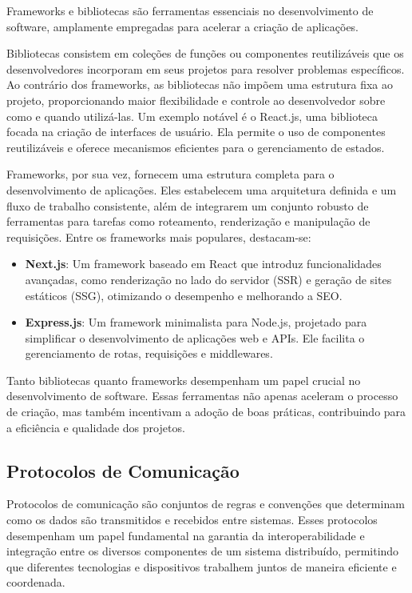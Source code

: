 
Frameworks e bibliotecas são ferramentas essenciais no desenvolvimento de software, amplamente empregadas para acelerar a criação de aplicações.

Bibliotecas consistem em coleções de funções ou componentes reutilizáveis que os desenvolvedores incorporam em seus projetos para resolver problemas específicos. Ao contrário dos frameworks, as bibliotecas não impõem uma estrutura fixa ao projeto, proporcionando maior flexibilidade e controle ao desenvolvedor sobre como e quando utilizá-las. Um exemplo notável é o React.js, uma biblioteca focada na criação de interfaces de usuário. Ela permite o uso de componentes reutilizáveis e oferece mecanismos eficientes para o gerenciamento de estados.

Frameworks, por sua vez, fornecem uma estrutura completa para o desenvolvimento de aplicações. Eles estabelecem uma arquitetura definida e um fluxo de trabalho consistente, além de integrarem um conjunto robusto de ferramentas para tarefas como roteamento, renderização e manipulação de requisições. Entre os frameworks mais populares, destacam-se:
\begin{itemize}
    \item \textbf{Next.js}: Um framework baseado em React que introduz funcionalidades avançadas, como renderização no lado do servidor (SSR) e geração de sites estáticos (SSG), otimizando o desempenho e melhorando a SEO.
    \item \textbf{Express.js}: Um framework minimalista para Node.js, projetado para simplificar o desenvolvimento de aplicações web e APIs. Ele facilita o gerenciamento de rotas, requisições e middlewares.
\end{itemize}

Tanto bibliotecas quanto frameworks desempenham um papel crucial no desenvolvimento de software. Essas ferramentas não apenas aceleram o processo de criação, mas também incentivam a adoção de boas práticas, contribuindo para a eficiência e qualidade dos projetos.


\subsection{Protocolos de Comunicação}

Protocolos de comunicação são conjuntos de regras e convenções que determinam como os dados são transmitidos e recebidos entre sistemas. Esses protocolos desempenham um papel fundamental na garantia da interoperabilidade e integração entre os diversos componentes de um sistema distribuído, permitindo que diferentes tecnologias e dispositivos trabalhem juntos de maneira eficiente e coordenada.

